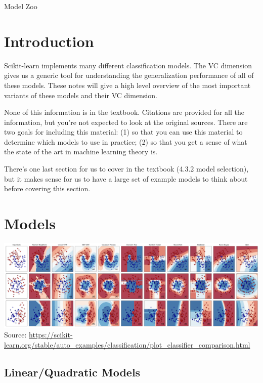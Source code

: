 \documentclass[10pt]{exam}
\theoremstyle{definition}
\begin{document}
\begin{center}
{
\Huge
Model Zoo
}
\end{center}

\section{Introduction}

Scikit-learn implements many different classification models.
The VC dimension gives us a generic tool for understanding the generalization performance of all of these models.
These notes will give a high level overview of the most important variants of these models and their VC dimension.

None of this information is in the textbook.
Citations are provided for all the information,
but you're not expected to look at the original sources.
There are two goals for including this material:
(1) so that you can use this material to determine which models to use in practice;
(2) so that you get a sense of what the state of the art in machine learning theory is.

There's one last section for us to cover in the textbook
(4.3.2 model selection),
but it makes sense for us to have a large set of example models to think about before covering this section.

\section{Models}

\begin{center}
    \hspace*{-0.75in}\includegraphics[width=8in]{sphx_glr_plot_classifier_comparison_001}
    \small
    Source: \url{https://scikit-learn.org/stable/auto_examples/classification/plot_classifier_comparison.html}
\end{center}

\newpage
\subsection{Linear/Quadratic Models}
\end{document}
